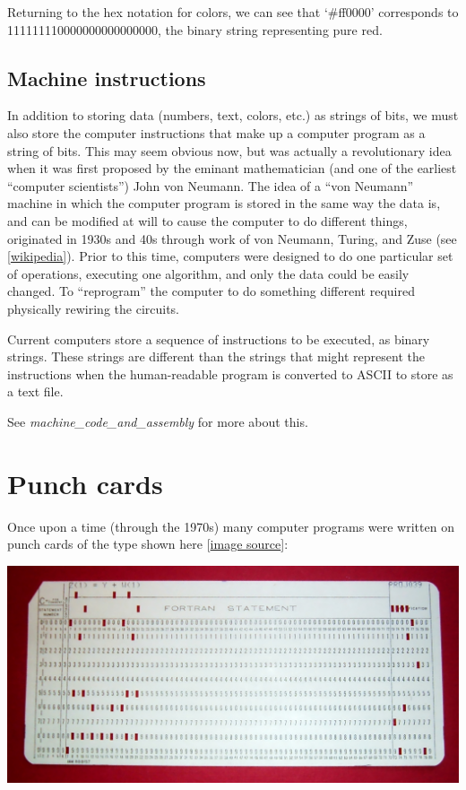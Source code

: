 \documentclass[letterpaper,10pt,english]{sphinxmanual}
\begin{document}
Returning to the hex notation for colors, we can see that `\#ff0000'
corresponds to 111111110000000000000000, the binary string representing pure
red.


\subsection{Machine instructions}
\label{memory:machine-instructions}
In addition to storing data (numbers, text, colors, etc.) as strings of
bits, we must also store the computer instructions that make up a computer
program as a string of bits.  This may seem obvious now, but was actually a
revolutionary idea when it was first proposed by the eminant mathematician
(and one of the earliest ``computer scientists'') John von Neumann.  The idea
of a ``von Neumann'' machine in which the computer program is stored in the
same way the data is, and can be modified at will to cause the computer to
do different things, originated in 1930s and 40s through work of von
Neumann, Turing, and Zuse (see \href{http://en.wikipedia.org/wiki/Von\_Neumann\_architecture}{{[}wikipedia{]}}).
Prior to this time, computers were designed to do one particular set of
operations, executing one algorithm, and only the data could be easily
changed.  To ``reprogram'' the computer to do something different required
physically rewiring the circuits.

Current computers store a sequence of instructions to be executed, as binary
strings.  These strings are different than the strings that might represent
the instructions when the human-readable program is converted to ASCII to
store as a text file.

See \emph{machine\_code\_and\_assembly} for more about this.


\section{Punch cards}
\label{punchcard:punch-cards}\label{punchcard:punchcard}\label{punchcard::doc}
Once upon a time (through the 1970s) many computer programs were written on
punch cards of the type shown here {[}\href{http://en.wikipedia.org/wiki/File:FortranCardPROJ039.agr.jpg}{image source}{]}:

\includegraphics[width=20cm]{FortranCardPROJ039-agr.jpg}
\end{document}
